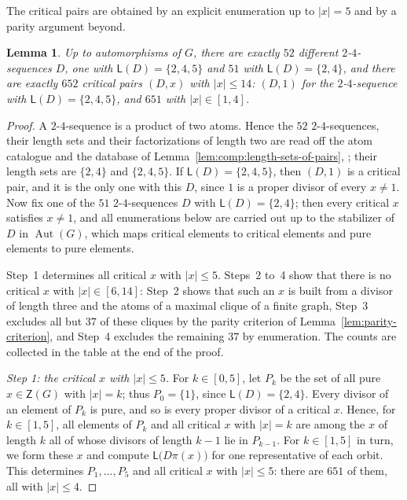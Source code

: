 \documentclass[a4paper, 10pt]{amsart}
\theoremstyle{plain}
\newtheorem{lemma}[theorem]{\bf Lemma}
\theoremstyle{definition}
\theoremstyle{definition}
\DeclareMathOperator{\Aut}{Aut} \DeclareMathOperator{\GL}{GL}
\newcommand{\code}[1]{\texttt{\detokenize{#1}}}
\numberwithin{equation}{section}
\begin{document}
The critical pairs are obtained by an explicit enumeration up to $|x| = 5$ and by a
parity argument beyond.

\begin{lemma} \label{lem:comp:carrier-antichain}
Up to automorphisms of $G$, there are exactly $52$ different $2$-$4$-sequences $D$, one
with $\mathsf L (D) = \{2,4,5\}$ and $51$ with $\mathsf L (D) = \{2,4\}$,
and there are exactly $652$ critical pairs $(D,x)$ with $|x| \le 14$:
$(D,1)$ for the $2$-$4$-sequence with $\mathsf L (D) = \{2,4,5\}$, and $651$
with $|x| \in [1,4]$.
\end{lemma}

\begin{proof}
A $2$-$4$-sequence is a product of two atoms.  Hence the $52$
$2$-$4$-sequences, their length sets and their factorizations of length two
are read off the atom catalogue and the database of
Lemma~\ref{lem:comp:length-sets-of-pairs},
\code{length-sets-with-minimum-2.jsonl}; their length sets are $\{2,4\}$ and
$\{2,4,5\}$.  If $\mathsf L (D) = \{2,4,5\}$, then $(D,1)$ is
a critical pair, and it is the only one with this $D$, since $1$ is a proper divisor of
every $x \ne 1$.  Now fix one of the $51$ $2$-$4$-sequences $D$ with
$\mathsf L (D) = \{2,4\}$; then every critical $x$ satisfies $x \ne 1$, and all
enumerations below are carried out up to the stabilizer of $D$ in $\Aut (G)$,
which maps critical elements to critical elements and pure elements to pure
elements.

Step~1 determines all critical $x$ with $|x| \le 5$.  Steps~2 to~4 show that
there is no critical $x$ with $|x| \in [6, 14]$: Step~2 shows that such an $x$ is built from a
divisor of length three and the atoms of a maximal clique of a finite graph,
Step~3 excludes all but $37$ of these cliques by the parity criterion of
Lemma~\ref{lem:parity-criterion}, and Step~4 excludes the remaining $37$ by
enumeration.  The counts are collected in the table at the end of the proof.

\emph{Step 1: the critical $x$ with $|x| \le 5$.}  For $k \in [0,5]$, let
$P_k$ be the set of all pure $x \in \mathsf Z (G)$ with $|x| = k$; thus
$P_0 = \{1\}$, since $\mathsf L (D) = \{2,4\}$.  Every divisor of an element of
$P_k$ is pure, and so is every proper divisor of a critical $x$.  Hence, for
$k \in [1,5]$, all elements of $P_k$ and all critical $x$ with $|x| = k$ are
among the $x$ of length $k$ all of whose divisors of length $k-1$ lie in
$P_{k-1}$.  For $k \in [1, 5]$ in turn, we form these $x$ and compute
$\mathsf L \big( D\pi(x) \big)$ for one representative of each orbit.  This determines
$P_1, \ldots, P_5$ and all critical $x$ with $|x| \le 5$: there are $651$ of
them, all with $|x| \le 4$.


\end{proof}
\end{document}

